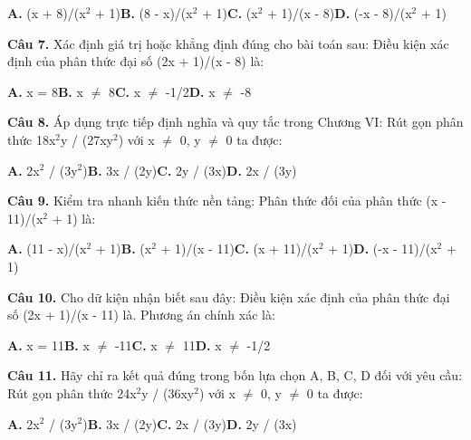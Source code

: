 \documentclass[11pt,a4paper]{article}
\begin{document}
\hspace*{1.5em}\textbf{A.} (x + 8)/(x$^2$ + 1)\quad\quad \textbf{B.} (8 - x)/(x$^2$ + 1)\quad\quad \textbf{C.} (x$^2$ + 1)/(x - 8)\quad\quad \textbf{D.} (-x - 8)/(x$^2$ + 1)\par\vspace{2pt}
\textbf{\color{primary} Câu 7.} Xác định giá trị hoặc khẳng định đúng cho bài toán sau: Điều kiện xác định của phân thức đại số (2x + 1)/(x - 8) là:\par
\hspace*{1.5em}\textbf{A.} x = 8\quad\quad \textbf{B.} x $\ne$ 8\quad\quad \textbf{C.} x $\ne$ -1/2\quad\quad \textbf{D.} x $\ne$ -8\par\vspace{2pt}
\textbf{\color{primary} Câu 8.} Áp dụng trực tiếp định nghĩa và quy tắc trong Chương VI: Rút gọn phân thức 18x$^2$y / (27xy$^2$) với x $\ne$ 0, y $\ne$ 0 ta được:\par
\hspace*{1.5em}\textbf{A.} 2x$^2$ / (3y$^2$)\quad\quad \textbf{B.} 3x / (2y)\quad\quad \textbf{C.} 2y / (3x)\quad\quad \textbf{D.} 2x / (3y)\par\vspace{2pt}
\textbf{\color{primary} Câu 9.} Kiểm tra nhanh kiến thức nền tảng: Phân thức đối của phân thức (x - 11)/(x$^2$ + 1) là:\par
\hspace*{1.5em}\textbf{A.} (11 - x)/(x$^2$ + 1)\quad\quad \textbf{B.} (x$^2$ + 1)/(x - 11)\quad\quad \textbf{C.} (x + 11)/(x$^2$ + 1)\quad\quad \textbf{D.} (-x - 11)/(x$^2$ + 1)\par\vspace{2pt}
\textbf{\color{primary} Câu 10.} Cho dữ kiện nhận biết sau đây: Điều kiện xác định của phân thức đại số (2x + 1)/(x - 11) là. Phương án chính xác là:\par
\hspace*{1.5em}\textbf{A.} x = 11\quad\quad \textbf{B.} x $\ne$ -11\quad\quad \textbf{C.} x $\ne$ 11\quad\quad \textbf{D.} x $\ne$ -1/2\par\vspace{2pt}
\textbf{\color{primary} Câu 11.} Hãy chỉ ra kết quả đúng trong bốn lựa chọn A, B, C, D đối với yêu cầu: Rút gọn phân thức 24x$^2$y / (36xy$^2$) với x $\ne$ 0, y $\ne$ 0 ta được:\par
\hspace*{1.5em}\textbf{A.} 2x$^2$ / (3y$^2$)\quad\quad \textbf{B.} 3x / (2y)\quad\quad \textbf{C.} 2x / (3y)\quad\quad \textbf{D.} 2y / (3x)\par\vspace{2pt}
\end{document}
